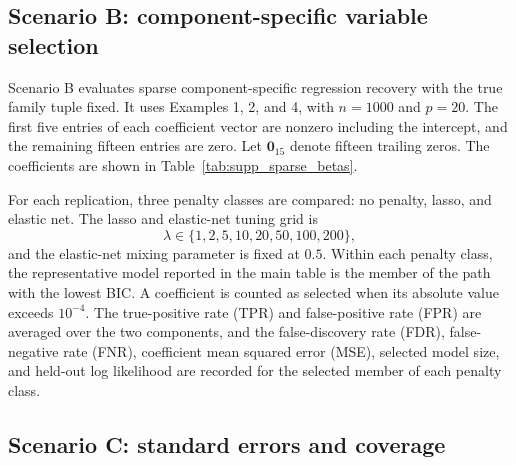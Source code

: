 \documentclass{article}
\begin{document}
\subsection{Scenario B: component-specific variable selection}

Scenario B evaluates sparse component-specific regression recovery with the
true family tuple fixed.  It uses Examples 1, 2, and 4, with \(n=1000\) and
\(p=20\).  The first five entries of each coefficient vector are nonzero
including the intercept, and the remaining fifteen entries are zero.  Let
\(\mathbf 0_{15}\) denote fifteen trailing zeros.  The coefficients are shown
in Table~\ref{tab:supp_sparse_betas}.

\begin{table}[htbp]
\centering
\caption{Sparse coefficient vectors used in Scenario B.}
\label{tab:supp_sparse_betas}
\end{table}

For each replication, three penalty classes are compared: no penalty, lasso,
and elastic net.  The lasso and elastic-net tuning grid is
\[
    \lambda\in\{1,2,5,10,20,50,100,200\},
\]
and the elastic-net mixing parameter is fixed at \(0.5\).  Within each penalty
class, the representative model reported in the main table is the member of the
path with the lowest BIC.  A coefficient is counted as selected when its
absolute value exceeds \(10^{-4}\).  The true-positive rate (TPR) and
false-positive rate (FPR) are averaged over the two components, and the
false-discovery rate (FDR), false-negative rate (FNR), coefficient mean squared
error (MSE), selected model size, and held-out log likelihood are recorded for
the selected member of each penalty class.

\subsection{Scenario C: standard errors and coverage}
\end{document}
